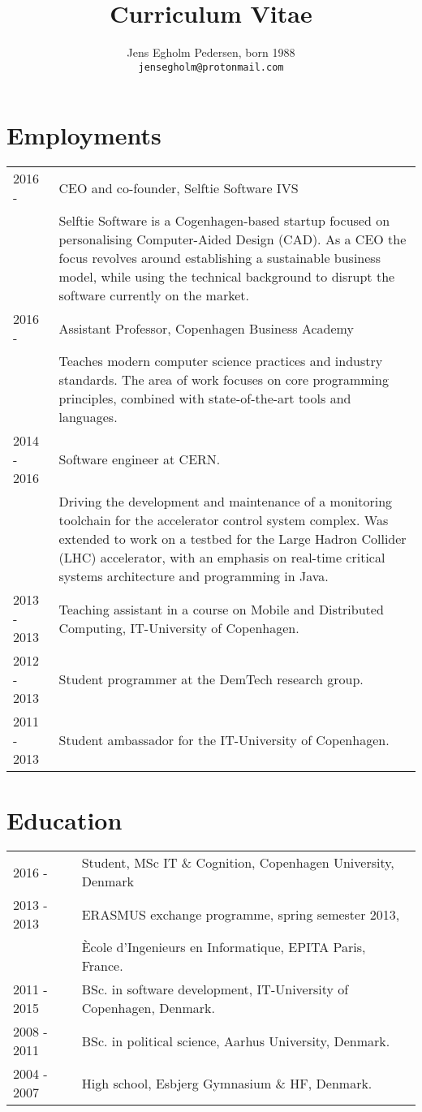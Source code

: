\documentclass[12pt,a4paper,notitlepage]{article}
\author{Jens Egholm Pedersen, born 1988
\\ \texttt{jensegholm@protonmail.com}
}
\title{Curriculum Vitae}
\begin{document}
\maketitle

\section*{Employments}
\begin{tabularx}{\textwidth}{l X}
2016 -      & CEO and co-founder, Selftie Software IVS \\
            & Selftie Software is a Cogenhagen-based startup focused on personalising
Computer-Aided Design (CAD). As a CEO the focus revolves around establishing a
sustainable business model, while using the technical background to disrupt
the software currently on the market.\\
2016 -      & Assistant Professor, Copenhagen Business Academy \\
            & Teaches modern computer science practices and industry standards.
The area of work focuses on core programming principles, combined with
state-of-the-art tools and languages. \\
2014 - 2016 & Software engineer at CERN. \\
            & Driving the development and maintenance of
a monitoring toolchain for the accelerator control system complex.
Was extended to work on a testbed for the Large Hadron Collider (LHC)
accelerator, with an emphasis on real-time critical systems architecture and
programming in Java.\\
2013 - 2013 & Teaching assistant in a course on Mobile and Distributed Computing, IT-University of Copenhagen. \\
2012 - 2013 & Student programmer at the DemTech research group. \\
2011 - 2013 & Student ambassador for the IT-University of Copenhagen.
\end{tabularx}

\section*{Education}
\begin{tabularx}{\textwidth}{l X}
  2016 - & Student, MSc IT \& Cognition, Copenhagen University, Denmark \\
2013 - 2013 & ERASMUS exchange programme, spring semester 2013, \\
            & Ècole d'Ingenieurs en Informatique, EPITA Paris, France. \\
2011 - 2015 & BSc. in software development, IT-University of Copenhagen, Denmark. \\
2008 - 2011 & BSc. in political science, Aarhus University, Denmark. \\
2004 - 2007 & High school, Esbjerg Gymnasium \& HF, Denmark.
\end{tabularx}
\end{document}
